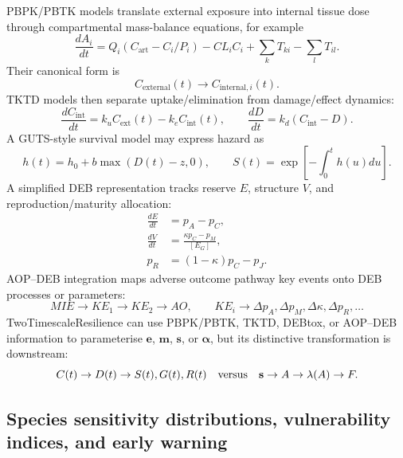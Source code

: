 	PBPK/PBTK models translate external exposure into internal tissue dose through compartmental mass-balance equations, for example
	\begin{equation}
		\frac{dA_i}{dt}
		= Q_i(C_{\mathrm{art}}-C_i/P_i)-CL_iC_i
		+\sum_k T_{ki}-\sum_l T_{il}.
	\end{equation}
	Their canonical form is
	\begin{equation}
		C_{\mathrm{external}}(t)\rightarrow C_{\mathrm{internal},i}(t).
	\end{equation}
	TKTD models then separate uptake/elimination from damage/effect dynamics:
	\begin{equation}
		\frac{dC_{\mathrm{int}}}{dt}=k_u C_{\mathrm{ext}}(t)-k_e C_{\mathrm{int}}(t),
		\qquad
		\frac{dD}{dt}=k_d(C_{\mathrm{int}}-D).
	\end{equation}
	A GUTS-style survival model may express hazard as
	\begin{equation}
		h(t)=h_0+b\max(D(t)-z,0),
		\qquad
		S(t)=\exp\left[-\int_0^t h(u)du\right].
	\end{equation}
	A simplified DEB representation tracks reserve $E$, structure $V$, and reproduction/maturity allocation:
	\begin{align}
		\frac{dE}{dt} &= p_A-p_C,\\
		\frac{dV}{dt} &= \frac{\kappa p_C-p_M}{[E_G]},\\
		p_R &= (1-\kappa)p_C-p_J.
	\end{align}
	AOP--DEB integration maps adverse outcome pathway key events onto DEB processes or parameters:
	\begin{equation}
		MIE\rightarrow KE_1\rightarrow KE_2\rightarrow AO,
		\qquad
		KE_i\rightarrow \Delta p_A,\Delta p_M,\Delta\kappa,\Delta p_R,\ldots
	\end{equation}
	TwoTimescaleResilience can use PBPK/PBTK, TKTD, DEBtox, or AOP--DEB information to parameterise $\mathbf{e}$, $\mathbf{m}$, $\mathbf{s}$, or $\bm{\alpha}$, but its distinctive transformation is downstream:
	\begin{equation}
		C(t)\rightarrow D(t)\rightarrow S(t),G(t),R(t)
		\quad\hbox{versus}\quad
		\mathbf{s}\rightarrow A\rightarrow\lambda(A)\rightarrow F.
	\end{equation}
	
	\subsection{Species sensitivity distributions, vulnerability indices, and early warning}
	
